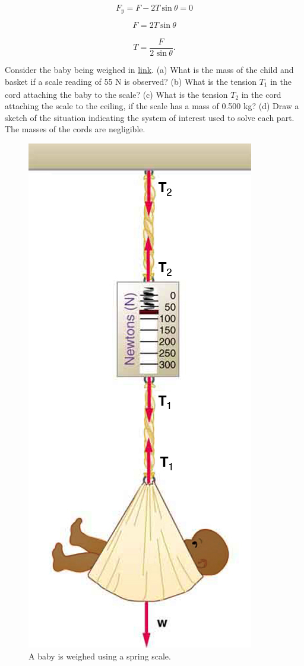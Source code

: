 \documentclass[
]{book}
\begin{document}
\leavevmode{}%
\[{{F_{y} = {F - 2T}\ }\text{sin}\ {\theta = 0}}{}\]

\leavevmode{}%
\[{{F_{} = 2T\ }\text{sin}\ \theta}{}\]

\leavevmode{}%
\[{T = \frac{F_{}}{\text{2\ sin}\ \theta}}.\]

\hypertarget{fs-id2372303}{}
\leavevmode{}%
Consider the baby being weighed in
\protect\hyperlink{import-auto-id2140140}{link}. (a) What is the
mass of the child and basket if a scale reading of 55 N is observed? (b)
What is the tension \(T_{1}{}\)\textsubscript{} in the
cord attaching the baby to the scale? (c) What is the tension \(T_{2}{}\)
in the cord attaching the scale to the ceiling, if the scale has a mass
of 0.500 kg? (d) Draw a sketch of the situation indicating the system of
interest used to solve each part. The masses of the cords are
negligible.

\begin{figure}
\hypertarget{import-auto-id2140140}{%
\centering
\includegraphics{images/Figure_04_05_14.jpg}
\caption{A baby is weighed using a spring
scale.}\label{import-auto-id2140140}
}
\end{figure}
\end{document}
